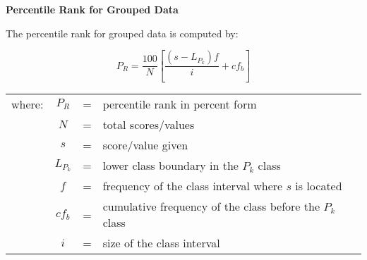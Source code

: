 \begin{center}
\textbf{Percentile Rank for Grouped Data}
\end{center}

\vspace*{1ex}

The percentile rank for grouped data is computed by: 

\[
P_R=\dfrac{100}{N} \left[\dfrac{(s - L_{P_k}) f}{i} + cf_b \right]
\] 

\begin{center}
\begin{tabular}{lcll}
where: & $P_R$ & = & percentile rank in percent form\\
 & $N$& = & total scores/values  \\
& $s$ & = & score/value given \\ 
& $L_{P_k} $ & = & lower class boundary in the $P_k$ class  \\ 
& $f$ & = & frequency  of the  class interval where $s$ is located \\ 
& $cf_b$ & = & \makecell[tl]{cumulative frequency of the  class \\ before  the $P_k$ class}\\ 
& $i$ & = & size of the class interval \\ 
\end{tabular} 
\end{center}